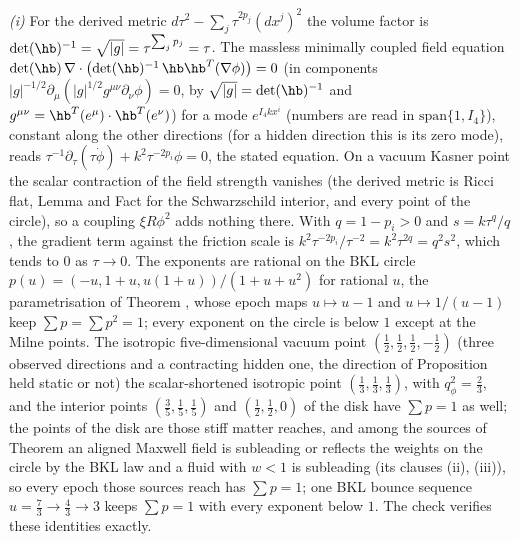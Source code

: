 \emph{(i)} For the derived metric $d\tau^{2} - \sum_{j}\tau^{2p_{j}}(dx^{j})^{2}$ the volume factor is $\det(\hb)^{-1} = \sqrt{|g|} = \tau^{\sum_{j}p_{j}} = \tau$. The massless minimally coupled field equation $\det(\hb)\,\nabla\cdot\bigl(\det(\hb)^{-1}\,\hb\hb^{T}(\nabla\phi)\bigr) = 0$ (in components $|g|^{-1/2}\partial_{\mu}(|g|^{1/2}g^{\mu\nu}\partial_{\nu}\phi) = 0$, by $\sqrt{|g|} = \det(\hb)^{-1}$ and $g^{\mu\nu} = \hb^{T}(e^{\mu})\cdot\hb^{T}(e^{\nu})$) for a mode $e^{I_{4}kx^{i}}$ (numbers are read in $\mathrm{span}\{1, I_{4}\}$), constant along the other directions (for a hidden direction this is its zero mode), reads $\tau^{-1}\partial_{\tau}(\tau\dot\phi) + k^{2}\tau^{-2p_{i}}\phi = 0$, the stated equation. On a vacuum Kasner point the scalar contraction of the field strength vanishes (the derived metric is Ricci flat, Lemma  and Fact  for the Schwarzschild interior, and every point of the circle), so a coupling $\xi R\phi^{2}$ adds nothing there. With $q = 1 - p_{i} > 0$ and $s = k\tau^{q}/q$, the gradient term against the friction scale is $k^{2}\tau^{-2p_{i}}/\tau^{-2} = k^{2}\tau^{2q} = q^{2}s^{2}$, which tends to $0$ as $\tau \to 0$. The exponents are rational on the BKL circle $p(u) = (-u, 1 + u, u(1 + u))/(1 + u + u^{2})$ for rational $u$, the parametrisation of Theorem , whose epoch maps $u \mapsto u - 1$ and $u \mapsto 1/(u - 1)$ keep $\sum p = \sum p^{2} = 1$; every exponent on the circle is below $1$ except at the Milne points. The isotropic five-dimensional vacuum point $(\tfrac12, \tfrac12, \tfrac12, -\tfrac12)$ (three observed directions and a contracting hidden one, the direction of Proposition  held static or not) the scalar-shortened isotropic point $(\tfrac13, \tfrac13, \tfrac13)$, with $q_{\phi}^{2} = \tfrac23$, and the interior points $(\tfrac35, \tfrac15, \tfrac15)$ and $(\tfrac12, \tfrac12, 0)$ of the disk have $\sum p = 1$ as well; the points of the disk are those stiff matter reaches, and among the sources of Theorem  an aligned Maxwell field is subleading or reflects the weights on the circle by the BKL law and a fluid with $w < 1$ is subleading (its clauses (ii), (iii)), so every epoch those sources reach has $\sum p = 1$; one BKL bounce sequence $u = \tfrac73 \to \tfrac43 \to 3$ keeps $\sum p = 1$ with every exponent below $1$. The check verifies these identities exactly.


